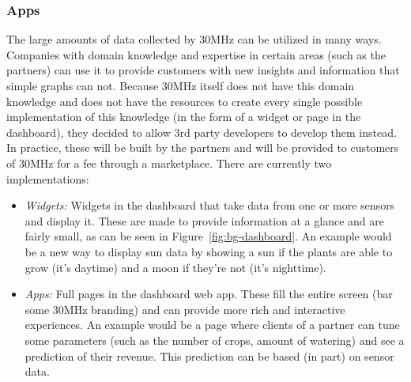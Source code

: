 \subsubsection{Apps}\label{sec:bg-apps}
The large amounts of data collected by 30MHz can be utilized in many ways. Companies with domain knowledge and expertise in certain areas (such as the partners) can use it to provide customers with new insights and information that simple graphs can not. Because 30MHz itself does not have this domain knowledge and does not have the resources to create every single possible implementation of this knowledge (in the form of a widget or page in the dashboard), they decided to allow 3rd party developers to develop them instead. In practice, these will be built by the partners and will be provided to customers of 30MHz for a fee through a marketplace. There are currently two implementations:

\begin{itemize}
	\item \emph{Widgets:} Widgets in the dashboard that take data from one or more sensors and display it. These are made to provide information at a glance and are fairly small, as can be seen in Figure~\ref{fig:bg-dashboard}. An example would be a new way to display sun data by showing a sun if the plants are able to grow (it's daytime) and a moon if they're not (it's nighttime).
	\item \emph{Apps:} Full pages in the dashboard web app. These fill the entire screen (bar some 30MHz branding) and can provide more rich and interactive experiences. An example would be a page where clients of a partner can tune some parameters (such as the number of crops, amount of watering) and see a prediction of their revenue. This prediction can be based (in part) on sensor data.
\end{itemize}

